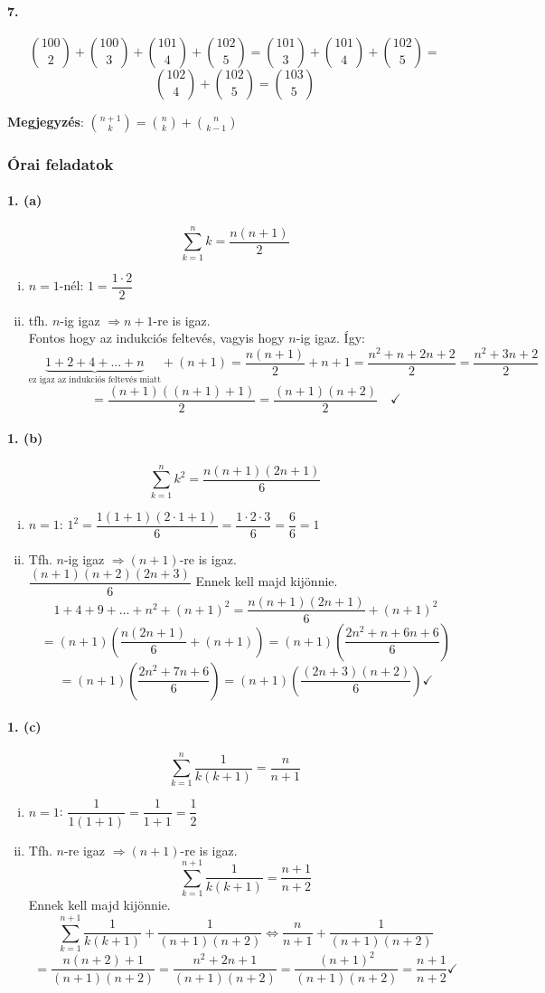 \documentclass[12pt,a4paper,fleqn]{article}
\newcommand{\myparagraph}[1]{\paragraph{#1}\mbox{}}
\begin{document}
\myparagraph{7.}
\[ \binom{100}{2} + \binom{100}{3} + \binom{101}{4} + \binom{102}{5} =
  \binom{101}{3} + \binom{101}{4} + \binom{102}{5} = \]
\[ \binom{102}{4} + \binom{102}{5} = \binom{103}{5} \]
\begin{flushright}
  \textbf{Megjegyzés}: $\binom{n+1}{k} = \binom{n}{k} + \binom{n}{k-1}$
\end{flushright}

\subsubsection{Órai feladatok}

\myparagraph{1. (a)}
\[ \sum_{k=1}^{n} k = \dfrac{n(n+1)}{2}\]
\begin{enumerate}[i.]
  \item $n=1$-nél: $ 1 = \dfrac{1 \cdot 2}{2} $ \checkmark
  \item tfh. $n$-ig igaz $\Rightarrow n+1$-re is igaz. \\
  Fontos hogy az indukciós feltevés, vagyis hogy $n$-ig igaz. Így:
  \[ \underbrace{1+2+4+...+n}_{\text{ez igaz az indukciós feltevés miatt}}
    + (n+1) = \dfrac{n(n+1)}{2} + n + 1 = \dfrac{n^2+n+2n+2}{2} = \dfrac{n^2+3n+2}{2} \]
  \[ = \dfrac{(n+1)((n+1) + 1)}{2} = \dfrac{(n+1)(n+2)}{2} \quad \checkmark \]
\end{enumerate}


\myparagraph{1. (b)}
\[ \sum_{k=1}^{n} k^2 = \dfrac{n(n+1)(2n+1)}{6} \]
\begin{enumerate}[i.]
  \item $n=1$: $1^2 = \dfrac{1(1+1)(2 \cdot 1 + 1)}{6} = \dfrac{1 \cdot 2 \cdot 3}{6} = \dfrac{6}{6} = 1$ \checkmark
  \item Tfh. $n$-ig igaz $\Rightarrow (n+1)$-re is igaz. \\[1.2em]
  $ \dfrac{(n+1)(n+2)(2n+3)}{6} $ Ennek kell majd kijönnie.
  \[ 1 + 4 + 9 + ... + n^2 + (n+1)^2 = \dfrac{n(n+1)(2n+1)}{6} + (n+1)^2 \]
  \[ = (n+1) \left( \dfrac{n(2n+1)}{6} + (n+1) \right) = (n+1) \left( \dfrac{2n^2+n+6n+6}{6} \right) \]
  \[ = (n+1) \left( \dfrac{2n^2+7n+6}{6} \right) = (n+1) \left( \dfrac{(2n+3)(n+2)}{6} \right) \checkmark \]
\end{enumerate}


\myparagraph{1. (c)}
\[ \sum_{k=1}^{n} \dfrac{1}{k(k+1)} = \dfrac{n}{n+1} \]
\begin{enumerate}[i.]
  \item $n=1$: $\dfrac{1}{1(1+1)} = \dfrac{1}{1+1} = \dfrac{1}{2}$
  \item Tfh. $n$-re igaz $\Rightarrow (n+1)$-re is igaz.
  \[ \sum_{k=1}^{n+1} \dfrac{1}{k(k+1)} = \dfrac{n+1}{n+2} \]
  Ennek kell majd kijönnie.
  \[ \sum_{k=1}^{n+1} \dfrac{1}{k(k+1)} + \dfrac{1}{(n+1)(n+2)} \iff \dfrac{n}{n+1} + \dfrac{1}{(n+1)(n+2)} \]
  \[ = \dfrac{n(n+2)+1}{(n+1)(n+2)} = \dfrac{n^2+2n+1}{(n+1)(n+2)}
    = \dfrac{(n+1)^2}{(n+1)(n+2)} = \dfrac{n+1}{n+2} \checkmark \]

\end{enumerate}
\end{document}
